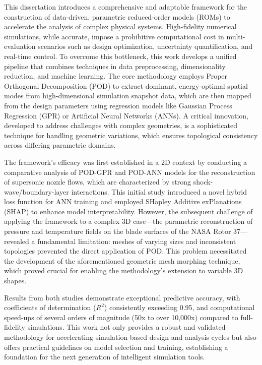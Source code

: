 \documentclass[dscexam, EN]{ufabcFHZh}
\begin{document}
\begin{foreignabstract}

This dissertation introduces a comprehensive and adaptable framework for the construction of data-driven, parametric reduced-order models (ROMs) to accelerate the analysis of complex physical systems. High-fidelity numerical simulations, while accurate, impose a prohibitive computational cost in multi-evaluation scenarios such as design optimization, uncertainty quantification, and real-time control. To overcome this bottleneck, this work develops a unified pipeline that combines techniques in data preprocessing, dimensionality reduction, and machine learning. The core methodology employs Proper Orthogonal Decomposition (POD) to extract dominant, energy-optimal spatial modes from high-dimensional simulation snapshot data, which are then mapped from the design parameters using regression models like Gaussian Process Regression (GPR) or Artificial Neural Networks (ANNs). A critical innovation, developed to address challenges with complex geometries, is a sophisticated technique for handling geometric variations, which ensures topological consistency across differing parametric domains.

The framework's efficacy was first established in a 2D context by conducting a comparative analysis of POD-GPR and POD-ANN models for the reconstruction of supersonic nozzle flows, which are characterized by strong shock-wave/boundary-layer interactions. This initial study introduced a novel hybrid loss function for ANN training and employed SHapley Additive exPlanations (SHAP) to enhance model interpretability. However, the subsequent challenge of applying the framework to a complex 3D case—the parametric reconstruction of pressure and temperature fields on the blade surfaces of the NASA Rotor 37—revealed a fundamental limitation: meshes of varying sizes and inconsistent topologies prevented the direct application of POD. This problem necessitated the development of the aforementioned geometric mesh morphing technique, which proved crucial for enabling the methodology's extension to variable 3D shapes.

Results from both studies demonstrate exceptional predictive accuracy, with coefficients of determination ($R^2$) consistently exceeding 0.95, and computational speed-ups of several orders of magnitude (50x to over 10,000x) compared to full-fidelity simulations. This work not only provides a robust and validated methodology for accelerating simulation-based design and analysis cycles but also offers practical guidelines on model selection and training, establishing a foundation for the next generation of intelligent simulation tools.

\end{foreignabstract}
\end{document}
